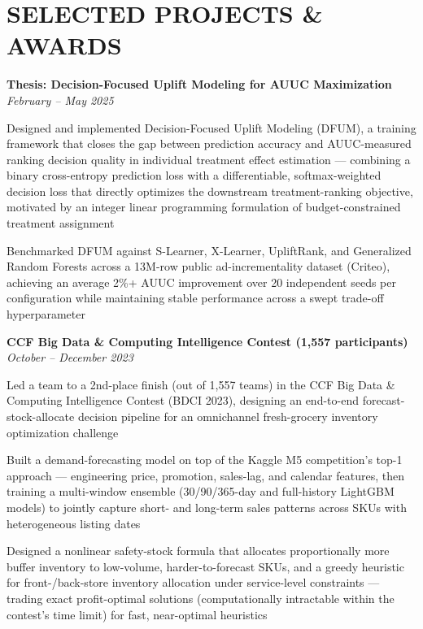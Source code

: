 \documentclass[letterpaper,11pt]{article}
\newcommand{\projheader}[2]{%
  \vspace{1pt}%
  {\textbf{#1} \hfill \textit{#2}} \\[-4pt]
}
\begin{document}
\section{SELECTED PROJECTS \& AWARDS}

\projheader{Thesis: Decision-Focused Uplift Modeling for AUUC Maximization}{February -- May 2025}
{\small\begin{rbullet}
  \item Designed and implemented Decision-Focused Uplift Modeling (DFUM), a training framework that closes the gap between prediction accuracy and AUUC-measured ranking decision quality in individual treatment effect estimation — combining a binary cross-entropy prediction loss with a differentiable, softmax-weighted decision loss that directly optimizes the downstream treatment-ranking objective, motivated by an integer linear programming formulation of budget-constrained treatment assignment
  \item Benchmarked DFUM against S-Learner, X-Learner, UpliftRank, and Generalized Random Forests across a 13M-row public ad-incrementality dataset (Criteo), achieving an average 2\%+ AUUC improvement over 20 independent seeds per configuration while maintaining stable performance across a swept trade-off hyperparameter
\end{rbullet}}

\projheader{CCF Big Data \& Computing Intelligence Contest \textnormal{(1,557 participants)}}{October -- December 2023}
{\small\begin{rbullet}
  \item Led a team to a 2nd-place finish (out of 1,557 teams) in the CCF Big Data \& Computing Intelligence Contest (BDCI 2023), designing an end-to-end forecast-stock-allocate decision pipeline for an omnichannel fresh-grocery inventory optimization challenge
  \item Built a demand-forecasting model on top of the Kaggle M5 competition's top-1 approach — engineering price, promotion, sales-lag, and calendar features, then training a multi-window ensemble (30/90/365-day and full-history LightGBM models) to jointly capture short- and long-term sales patterns across SKUs with heterogeneous listing dates
  \item Designed a nonlinear safety-stock formula that allocates proportionally more buffer inventory to low-volume, harder-to-forecast SKUs, and a greedy heuristic for front-/back-store inventory allocation under service-level constraints — trading exact profit-optimal solutions (computationally intractable within the contest's time limit) for fast, near-optimal heuristics
\end{rbullet}}
\end{document}
